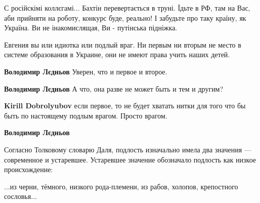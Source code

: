 \begin{itemize}
С російскімі коллєгамі... Бахтін перевертається в труні. Їдьте в РФ, там на Вас, аби прийняти на роботу, конкурс буде, реально! \Smiley[1.0][yellow] І забудьте про таку країну, як Україна. Ви не інакомислящая, Ви - путінська підніжка.

 
Евгения вы или идиотка или подлый враг. Ни первым ни вторым не место в системе образования в Украине, они не имеют права учить наших детей.

\begin{itemize}
 
\textbf{Володимир Лєдньов} Уверен, что и первое и второе.

 
\textbf{Володимир Лєдньов} А что, она разве не может быть и тем и другим?

 
\textbf{Kirill Dobrolyubov} если первое, то не будет хватать нитки для того что бы быть по настоящему подлым врагом. Просто врагом. \Smiley[1.0][yellow]

 
\textbf{Володимир Лєдньов} 

Согласно Толковому словарю Даля, подлость изначально имела два значения —
современное и устаревшее. Устаревшее значение обозначало подлость как низкое
происхождение:

...из черни, тёмного, низкого рода-племени, из рабов, холопов, крепостного сословья...



\end{itemize}
\end{itemize}
